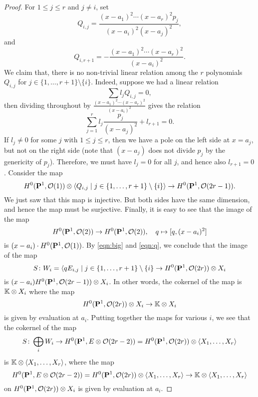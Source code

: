 \begin{proof}
  For $1 \leq j \leq r$ and $j \neq i$, set
  \[
    Q_{i,j} = \frac{(x-a_1)^2 \cdots (x-a_r)^2p_j}{(x-a_i)^2(x-a_j)^2}, 
  \]
  and
  \[
    Q_{i,r+1} = - \frac{(x-a_1)^2 \cdots (x-a_r)^2}{(x-a_i)^2}.
  \]
  We claim that, there is no non-trivial linear relation among the $r$ polynomials $Q_{i,j}$ for $j \in \{1, \dots, r+1\} \setminus \{i\}$.
  Indeed, suppose we had a linear relation
  \[ \sum l_j Q_{i,j} = 0,\]
  then dividing throughout by $\frac{(x-a_1)^2\cdots (x-a_r)^2}{(x-a_i)^2}$ gives the relation
  \[ \sum_{j = 1}^r l_j \frac{p_j}{(x-a_j)^2} + l_{r+1} = 0.\]
  If $l_j \neq 0$ for some $j$ with $1 \leq j \leq r$, then we have a pole on the left side at $x = a_j$, but not on the right side (note that $(x-a_j)$ does not divide $p_j$ by the genericity of $p_j$).
  Therefore, we must have $l_j = 0$ for all $j$, and hence also $l_{r+1} = 0$.
  Consider the map
  \begin{equation}\label{eqn:big}
    H^0({\bf P}^1, \mathcal O(1)) \otimes \langle  Q_{i,j} \mid j \in \{1, \dots, r+1\} \setminus \{i\}\rangle \to H^0({\bf P}^1, \mathcal O(2r-1)).
  \end{equation}
  We just saw that this map is injective.
  But both sides have the same dimension, and hence the map must be surjective.
  Finally, it is easy to see that the image of the map
  \begin{equation}\label{eqn:q}
    H^0({\bf P}^1, \mathcal O(2)) \to H^0({\bf P}^1, \mathcal O(2)), \quad q \mapsto [q, (x-a_i)^2]
  \end{equation}
  is $(x-a_i)\cdot H^0({\bf P}^1, \mathcal O(1))$.
  By \eqref{eqn:big} and \eqref{eqn:q}, we conclude that the image of the map
  \[ S {\colon} W_i = \langle qE_{i,j} \mid j \in\{1, \dots, r+1\} \setminus \{i\} \to H^0({\bf P}^1, \mathcal O(2r)) \otimes X_i\]
  is $(x-a_i)H^0({\bf P}^1, \mathcal O(2r-1)) \otimes X_i$.
  In other words, the cokernel of the map is $\mathbb{K} \otimes X_i$ where the map
  \[H^0({\bf P}^1, \mathcal O(2r)) \otimes X_i \to \mathbb{K} \otimes X_i \]
  is given by evaluation at $a_i$.
  Putting together the maps for various $i$, we see that the cokernel of the map
  \[ S {\colon} \bigoplus_i W_i \to H^0({\bf P}^1, E \otimes \mathcal O(2r-2)) = H^0({\bf P}^1, \mathcal O(2r)) \otimes \langle  X_1, \dots, X_r \rangle\]
  is $\mathbb{K} \otimes \langle  X_1, \dots, X_r \rangle$, where the map
  \begin{equation}\label{eqn:partialsur}
    H^0({\bf P}^1, E \otimes \mathcal O(2r-2)) = H^0({\bf P}^1, \mathcal O(2r)) \otimes \langle  X_1, \dots, X_r \rangle \to \mathbb{K} \otimes \langle  X_1, \dots, X_r \rangle
  \end{equation}
  on $H^0({\bf P}^1, \mathcal O(2r)) \otimes X_i$ is given by evaluation at $a_i$.


\end{proof}
